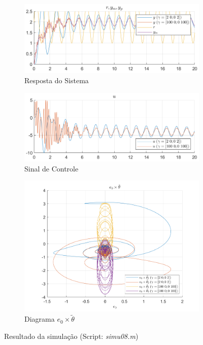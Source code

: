 \documentclass[10pt]{article}
\begin{document}
\begin{figure}[h!]
    \begin{subfigure}[b]{0.35\textwidth}
        \centering
        \includegraphics[width=\textwidth]{img/fig08c.png}
        \caption{Resposta do Sistema}
    \end{subfigure}
    \begin{subfigure}[b]{0.35\textwidth}
        \centering
        \includegraphics[width=\textwidth]{img/fig08e.png}
        \caption{Sinal de Controle}
    \end{subfigure}

    \begin{subfigure}[b]{0.35\textwidth}
        \centering
        \includegraphics[width=\textwidth]{img/fig08d.png}
        \caption{Diagrama $e_0 \times \tilde{\theta}$}
    \end{subfigure}

    \caption{Resultado da simulação (Script: \textit{simu08.m})}
    \label{fig:sim8}
\end{figure}
\end{document}
